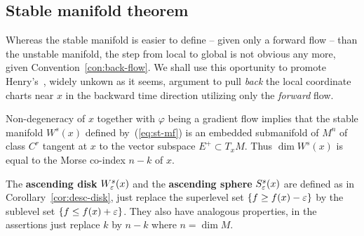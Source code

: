\documentclass{article}
\begin{document}
\subsection*{Stable manifold theorem}%
Whereas the stable manifold is easier to define -- given only a forward
flow -- than the unstable manifold, the step from local to global
is not obvious any more, given Convention~\ref{con:back-flow}. 
We shall use this oportunity to promote
Henry's~\cite{henry:1981a}, widely unkown as it seems,
argument to pull \emph{back} the local coordinate charts near $x$
in the backward time direction utilizing only the \emph{forward} flow.

\begin{theorem}\label{thm:st-mf-thm}
Non-degeneracy of $x$ together with $\varphi$ being a gradient flow
implies that the stable manifold $W^s(x)$ defined by~(\ref {eq:st-mf})
is an embedded submanifold of $M^n$ of class $C^r$
tangent at $x$ to the vector subspace $E^+\subset T_xM$.
Thus $\dim W^s(x)$ is equal to the Morse co-index $n-k$ of $x$.
\end{theorem}

\begin{remark} \label{rem:asc-disk}
The {\bf ascending disk} $W^s_{\varepsilon}(x)$ and the
{\bf ascending sphere} $S^s_{\varepsilon}(x)$ are defined as
in Corollary~\ref{cor:desc-disk}, just replace the superlevel set
$\{f\ge f(x)-{\varepsilon}\}$ by the sublevel set $\{f\le f(x)+{\varepsilon}\}$.
They also have analogous properties, in the assertions
just replace $k$ by $n-k$ where $n=\dim M$.
\end{remark}

\end{document}
